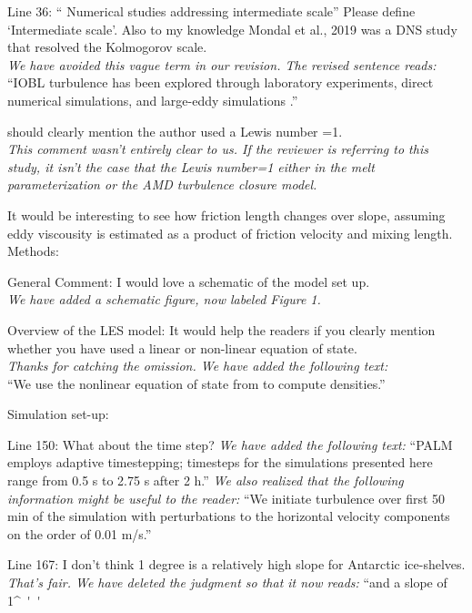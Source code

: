 \documentclass[tc, manuscript]{copernicus}
\begin{document}
Line 36: “ Numerical studies addressing intermediate scale”
Please define ‘Intermediate scale’. Also to my knowledge Mondal et al., 2019 was a DNS study that resolved the Kolmogorov scale.\\
\textit{We have avoided this vague term in our revision. The revised sentence reads:}\\
``IOBL turbulence has been explored through laboratory experiments, direct numerical simulations, and large-eddy simulations \citep{middleton_numerical_2021, mondal_ablation_2019, vreugdenhil_stratification_2019, mcconnochie_dissolution_2018}.''

should clearly mention the author used a Lewis number =1.\\
\textit{This comment wasn't entirely clear to us. If the reviewer is referring to this study, it isn't the case that the Lewis number=1 either in the melt parameterization or the AMD turbulence closure model.}

It would be interesting to see how friction length changes over slope, assuming eddy viscousity is estimated as a product of friction velocity and mixing length.\\

Methods:

General Comment: I would love a schematic of the model set up.\\
\textit{We have added a schematic figure, now labeled Figure 1.}

Overview of the LES model: It would help the readers if you clearly mention whether you have used a linear or non-linear equation of state.\\
\textit{Thanks for catching the omission. We have added the following text:}\\
``We use the nonlinear equation of state from  \citet{jackett_algorithms_2006} to compute densities.''

Simulation set-up:

Line 150: What about the time step?
\textit{We have added the following text:}
``PALM employs adaptive timestepping; timesteps for the simulations presented here range from 0.5 s to 2.75 s after 2 h.''
\textit{We also realized that the following information might be useful to the reader:}
``We initiate turbulence over first 50 min of the simulation with perturbations to the horizontal velocity components on the order of 0.01 m/s.''

Line 167: I don’t think 1 degree is a relatively high slope for Antarctic ice-shelves.
\textit{That's fair. We have deleted the judgment so that it now reads:}
``and a slope of 1\unit{^{\circ}}''
\end{document}
